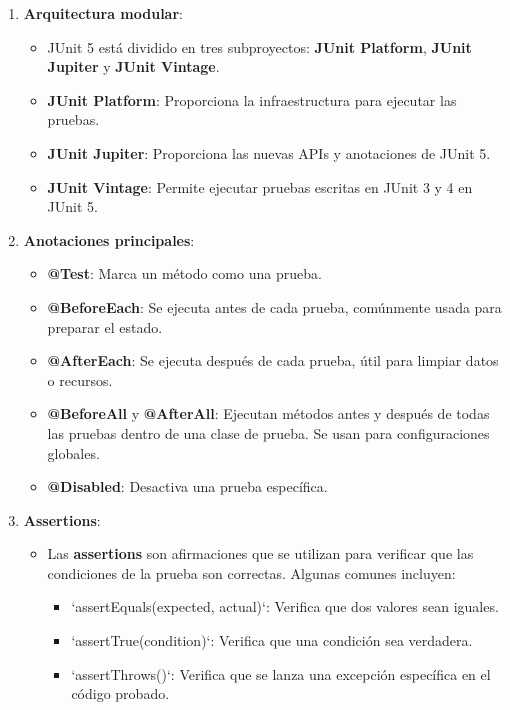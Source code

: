 \documentclass[11pt]{article}
\begin{document}
\begin{enumerate}
\item \textbf{\textbf{Arquitectura modular}}:
\begin{itemize}
\item JUnit 5 está dividido en tres subproyectos: \textbf{\textbf{JUnit Platform}}, \textbf{\textbf{JUnit Jupiter}} y \textbf{\textbf{JUnit Vintage}}.
\item \textbf{\textbf{JUnit Platform}}: Proporciona la infraestructura para ejecutar las pruebas.
\item \textbf{\textbf{JUnit Jupiter}}: Proporciona las nuevas APIs y anotaciones de JUnit 5.
\item \textbf{\textbf{JUnit Vintage}}: Permite ejecutar pruebas escritas en JUnit 3 y 4 en JUnit 5.
\end{itemize}

\item \textbf{\textbf{Anotaciones principales}}:
\begin{itemize}
\item \textbf{\textbf{@Test}}: Marca un método como una prueba.
\item \textbf{\textbf{@BeforeEach}}: Se ejecuta antes de cada prueba, comúnmente usada para preparar el estado.
\item \textbf{\textbf{@AfterEach}}: Se ejecuta después de cada prueba, útil para limpiar datos o recursos.
\item \textbf{\textbf{@BeforeAll}} y \textbf{\textbf{@AfterAll}}: Ejecutan métodos antes y después de todas las pruebas dentro de una clase de prueba. Se usan para configuraciones globales.
\item \textbf{\textbf{@Disabled}}: Desactiva una prueba específica.
\end{itemize}

\item \textbf{\textbf{Assertions}}:
\begin{itemize}
\item Las \textbf{\textbf{assertions}} son afirmaciones que se utilizan para verificar que las condiciones de la prueba son correctas. Algunas comunes incluyen:
\begin{itemize}
\item `assertEquals(expected, actual)`: Verifica que dos valores sean iguales.
\item `assertTrue(condition)`: Verifica que una condición sea verdadera.
\item `assertThrows()`: Verifica que se lanza una excepción específica en el código probado.
\end{itemize}
\end{itemize}


\end{enumerate}
\end{document}

